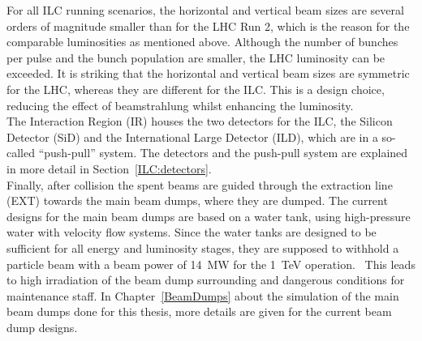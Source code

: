 For all ILC running scenarios, the horizontal and vertical beam sizes are several orders of magnitude smaller than for the LHC Run 2, which is the reason for the comparable luminosities as mentioned above.
Although the number of bunches per pulse and the bunch population are smaller, the LHC luminosity can be exceeded.
It is striking that the horizontal and vertical beam sizes are symmetric for the LHC, whereas they are different for the ILC.
This is a design choice, reducing the effect of beamstrahlung whilst enhancing the luminosity.\\
The Interaction Region (IR) houses the two detectors for the ILC, the Silicon Detector (SiD) and the International Large Detector (ILD), which are in a so-called ``push-pull'' system.
The detectors and the push-pull system are explained in more detail in Section~\ref{ILC:detectors}.\\
Finally, after collision the spent beams are guided through the extraction line (EXT) towards the main beam dumps, where they are dumped.
The current designs for the main beam dumps are based on a water tank, using high-pressure water with velocity flow systems.
Since the water tanks are designed to be sufficient for all energy and luminosity stages, they are supposed to withhold a particle beam with a beam power of \SI{14}{\mega\watt} for the \SI{1}{\TeV} operation.~\cite[p. 18]{TDR32}
This leads to high irradiation of the beam dump surrounding and dangerous conditions for maintenance staff.
In Chapter~\ref{BeamDumps} about the simulation of the main beam dumps done for this thesis, more details are given for the current beam dump designs.

